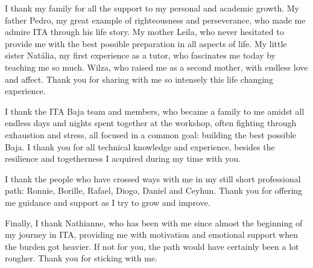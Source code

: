 	I thank my family for all the support to my personal and academic growth. My father Pedro, my great example of righteousness and perseverance, who made me admire ITA through his life story. My mother Leila, who never hesitated to provide me with the best possible preparation in all aspects of life. My little sister Nat{\'a}lia, my first experience as a tutor, who fascinates me today by teaching me so much. Wilza, who raised me as a second mother, with endless love and affect. Thank you for sharing with me so intensely this life changing experience.

	I thank the ITA Baja team and members, who became a family to me amidst all endless days and nights spent together at the workshop, often fighting through exhaustion and stress, all focused in a common goal: building the best possible Baja. I thank you for all technical knowledge and experience, besides the resilience and togetherness I acquired during my time with you.
	
	I thank the people who have crossed ways with me in my still short professional path: Ronnie, Borille, Rafael, Diogo, Daniel and Ceyhun. Thank you for offering me guidance and support as I try to grow and improve.
	
	Finally, I thank Nathianne, who has been with me since almost the beginning of my journey in ITA, providing me with motivation and emotional support when the burden got heavier. If not for you, the path would have certainly been a lot rougher. Thank you for sticking with me.